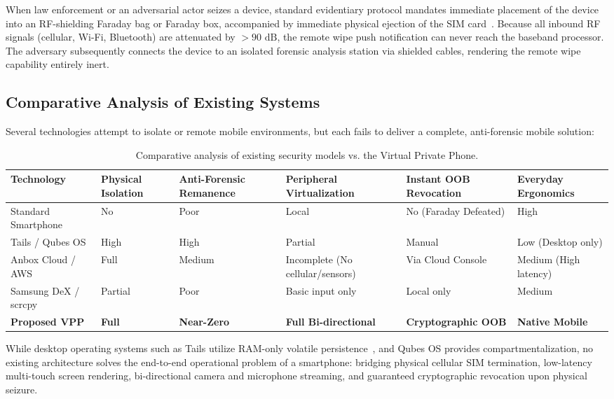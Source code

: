 When law enforcement or an adversarial actor seizes a device, standard evidentiary protocol mandates immediate placement of the device into an RF-shielding Faraday bag or Faraday box, accompanied by immediate physical ejection of the SIM card~\cite{nist800101r1}. Because all inbound RF signals (cellular, Wi-Fi, Bluetooth) are attenuated by $>90\text{ dB}$, the remote wipe push notification can never reach the baseband processor. The adversary subsequently connects the device to an isolated forensic analysis station via shielded cables, rendering the remote wipe capability entirely inert.

\subsection{Comparative Analysis of Existing Systems}
Several technologies attempt to isolate or remote mobile environments, but each fails to deliver a complete, anti-forensic mobile solution:
\begin{table}[h!]
\centering
\small
\begin{tabularx}{\textwidth}{lXXXXX}
\toprule
\textbf{Technology} & \textbf{Physical Isolation} & \textbf{Anti-Forensic Remanence} & \textbf{Peripheral Virtualization} & \textbf{Instant OOB Revocation} & \textbf{Everyday Ergonomics} \\
\midrule
Standard Smartphone & No & Poor & Local & No (Faraday Defeated) & High \\
Tails / Qubes OS & High & High & Partial & Manual & Low (Desktop only) \\
Anbox Cloud / AWS & Full & Medium & Incomplete (No cellular/sensors) & Via Cloud Console & Medium (High latency) \\
Samsung DeX / scrcpy & Partial & Poor & Basic input only & Local only & Medium \\
\textbf{Proposed VPP} & \textbf{Full} & \textbf{Near-Zero} & \textbf{Full Bi-directional} & \textbf{Cryptographic OOB} & \textbf{Native Mobile} \\
\bottomrule
\end{tabularx}
\caption{Comparative analysis of existing security models vs. the Virtual Private Phone.}
\label{tab:comparative_analysis}
\end{table}

While desktop operating systems such as Tails utilize RAM-only volatile persistence~\cite{chow2004shredder}, and Qubes OS provides compartmentalization, no existing architecture solves the end-to-end operational problem of a smartphone: bridging physical cellular SIM termination, low-latency multi-touch screen rendering, bi-directional camera and microphone streaming, and guaranteed cryptographic revocation upon physical seizure.

